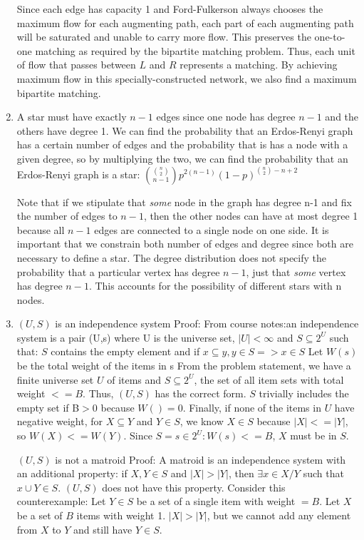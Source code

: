 \documentclass[]{article}
\begin{document}
\begin{enumerate}
	Since each edge has capacity 1 and Ford-Fulkerson always chooses the maximum flow for each augmenting path, each part of each augmenting path will be saturated and unable to carry more flow. This preserves the one-to-one matching as required by the bipartite matching problem. Thus, each unit of flow that passes between $L$ and $R$ represents a matching. By achieving maximum flow in this specially-constructed network, we also find a maximum bipartite matching. 
	
	\item A star must have exactly $n-1$ edges since one node has degree $n-1$ and the others have degree 1. We can find the probability that an Erdos-Renyi graph has a certain number of edges and the probability that is has a node with a given degree, so by multiplying the two, we can find the probability that an Erdos-Renyi graph is a star: ${{n \choose 2} \choose n-1}p^{2(n-1)}(1-p)^{{n \choose 2} - n + 2}$

	Note that if we stipulate that \textit{some} node in the graph has degree n-1 and fix the number of edges to $n-1$, then the other nodes can have at most degree 1 because all $n-1$ edges are connected to a single node on one side. It is important that we constrain both number of edges and degree since both are necessary to define a star. The degree distribution does not specify the probability that a particular vertex has degree $n-1$, just that \textit{some} vertex has degree $n-1$. This accounts for the possibility of different stars with n nodes.
	
	\item  $(U,S)$ is an independence system
	Proof:
	From course notes:an independence system is a pair (U,s) where U is the universe set, $|U| < \infty$ and $S \subseteq 2^U$ such that:
	$S$ contains the empty element and
	if $x \subseteq y, y \in S => x \in S$
	Let $W(s)$ be the total weight of the items in s
	From the problem statement, we have a finite universe set $U$ of items and $S \subseteq 2^U$, the set of all item sets with total weight $<= B$. Thus, $(U,S)$ has the correct form.
	$S$ trivially includes the empty set if B$ > 0$ because $W({})=0$.
	Finally, if none of the items in $U$ have negative weight, for $X \subseteq Y$ and $Y \in S$, we know $X \in S$ because $|X| <= |Y|$, so $W(X) <= W(Y)$. Since $S = {s \in 2^U:W(s) <= B}$, $X$ must be in $S$.
	
	$(U,S)$ is not a matroid
	Proof:
	A matroid is an independence system with an additional property: if $X,Y \in S$ and $|X| > |Y|$, then $\exists x \in X/Y$ such that ${x} \cup Y \in S$. $(U,S)$ does not have this property. Consider this counterexample: Let $Y \in S$ be a set of a single item with weight $= B$. Let $X$ be a set of $B$ items with weight 1. $|X| > |Y|$, but we cannot add any element from $X$ to $Y$ and still have $Y \in S$.
	

\end{enumerate}
\end{document}
